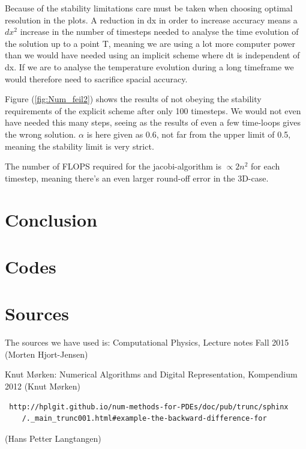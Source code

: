 \documentclass[a4paper,10pt]{article}
\begin{document}
Because of the stability limitations care must be taken when choosing optimal resolution in the plots. A reduction in dx in order to increase accuracy means a $dx^2$ increase in the number of timesteps needed to analyse the time evolution of the solution up to a point T, meaning we are using a lot more computer power than we would have needed using an implicit scheme where dt is independent of dx.
If we are to analyse the temperature evolution during a long timeframe we would therefore need to sacrifice spacial accuracy.

Figure (\ref{fig:Num_feil2}) shows the results of not obeying the stability requirements of the explicit scheme after only 100 timesteps. We would not even have needed this many steps, seeing as the results of even a few time-loops gives the wrong solution. $\alpha$ is here given as 0.6, not far from the upper limit of 0.5, meaning the stability limit is very strict.

The number of FLOPS required for the jacobi-algorithm is $\propto 2n^2$ for each timestep, meaning there's an even larger round-off error in the 3D-case.
\section{Conclusion}

\section{Codes}

\section{Sources}
The sources we have used is:
Computational Physics, Lecture notes Fall 2015 (Morten Hjort-Jensen)

Knut Mørken: Numerical Algorithms and Digital Representation, Kompendium 2012 (Knut Mørken)

\begin{verbatim}
 http://hplgit.github.io/num-methods-for-PDEs/doc/pub/trunc/sphinx
	/._main_trunc001.html#example-the-backward-difference-for  
\end{verbatim}
    (Hans Petter Langtangen)
\end{document}

